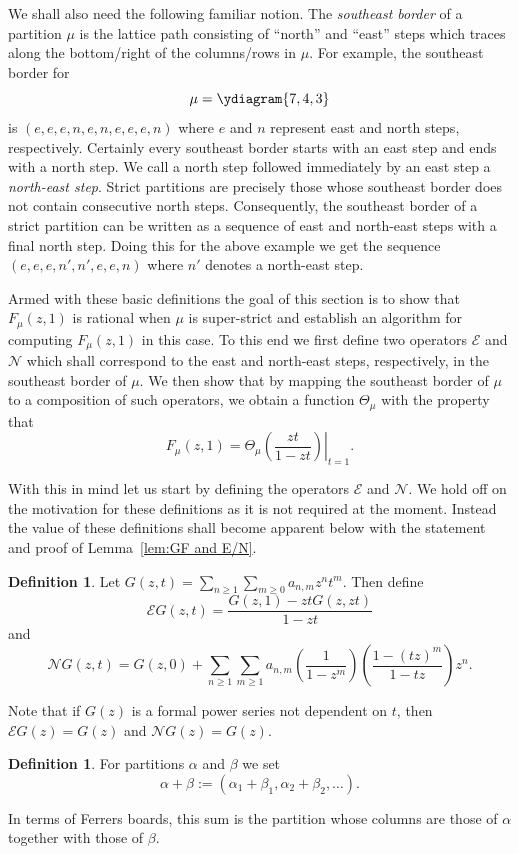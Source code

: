 \documentclass{article}
\theoremstyle{plain}
\theoremstyle{definition}
\newtheorem{definition}[theorem]{Definition}
\newcommand{\N}{\mathcal{N}}
\newcommand{\E}{\mathcal{E}}
\begin{document}
We shall also need the following familiar notion.  The \emph{southeast border} of a partition $\mu$ is the lattice path consisting of ``north'' and ``east'' steps which traces along the bottom/right of the columns/rows in $\mu$.  For example, the southeast border for 
$$\mu = \ydiagram{7,4,3}$$ 
is $(e,e,e,n,e,n,e,e,e,n)$ where $e$ and $n$ represent east and north steps, respectively. Certainly every southeast border starts with an east step and ends with a north step. We call a north step followed immediately by an east step a \emph{north-east step}.  Strict partitions are precisely those whose southeast border does not contain consecutive north steps.  Consequently, the southeast border of a strict partition can be written as a sequence of east and north-east steps with a final north step.   Doing this for the above example we get the sequence $(e,e,e,n',n',e,e,n)$ where $n'$ denotes a north-east step.   



Armed with these basic definitions the goal of this section is to show that $F_\mu(z,1)$ is rational when $\mu$ is super-strict and establish an algorithm for computing  $F_\mu(z,1)$ in this case. To this end we first define two operators $\E$ and $\N$ which shall correspond to the east and north-east steps, respectively, in the southeast border of $\mu$.  We then show that by mapping the southeast border of $\mu$ to a composition of such operators, we obtain a function $\Theta_\mu$ with the property that 
$$F_\mu(z,1) = \left.\Theta_\mu\left(\frac{zt}{1-zt}\right)\right|_{t=1}.$$

With this in mind let us start by defining the operators $\E$ and $\N$.  We hold off on the motivation for these definitions as it is not required at the moment.  Instead the value of these definitions shall become apparent below with the statement and proof of  Lemma~\ref{lem:GF and E/N}. 

\begin{definition}
Let $\displaystyle G(z,t) = \sum_{n\geq 1}\sum_{m\geq 0} a_{n,m} z^nt^m$.  Then define 
$$\E G(z,t) = \frac{G(z,1)-ztG(z,zt)}{1-zt}$$
and 
$$\N G(z,t) = G(z,0)+\sum_{n\geq 1}\sum_{m\geq 1} a_{n,m} \left(\frac{1}{1-z^m}\right)\left(\frac{1-(tz)^m}{1-tz}\right)z^n.$$
\end{definition} 

Note that if $G(z)$ is a formal power series not dependent on $t$, then $\E G(z) = G(z)$ and $\N G(z) = G(z)$.


\begin{definition}
For partitions $\alpha$ and $\beta$ we set
$$\alpha+\beta:= (\alpha_1+\beta_1, \alpha_2+\beta_2,\ldots).$$ 
\end{definition}
	\noindent In terms of Ferrers boards, this sum is the partition whose columns are those of $\alpha$ together with those of $\beta$.
\end{document}
